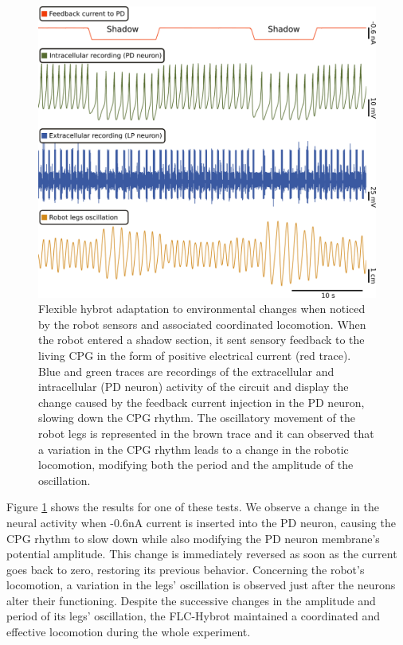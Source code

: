 \begin{figure}[hbt!]
	\begin{center}
		\includegraphics[width=0.8\linewidth]{./img/invariants/robot/robot_results_validation}
	\end{center}
	\caption{Flexible hybrot adaptation to environmental changes when noticed by the robot sensors and associated coordinated locomotion. When the robot entered a shadow section, it sent sensory feedback to the living CPG in the form of positive electrical current (red trace). Blue and green traces are recordings of the extracellular and intracellular (PD neuron) activity of the circuit and display the change caused by the feedback current injection in the PD neuron, slowing down the CPG rhythm. The oscillatory movement of the robot legs is represented in the brown trace and it can observed that a variation in the CPG rhythm leads to a change in the robotic locomotion, modifying both the period and the amplitude of the oscillation. 
	}
	\label{fig:robot_results_validation}
\end{figure}

Figure \ref{fig:robot_results_validation} shows the results for one of these tests. We observe a change in the neural activity when -0.6nA current is inserted into the PD neuron, causing the CPG rhythm to slow down while also modifying the PD neuron membrane's potential amplitude. This change is immediately reversed as soon as the current goes back to zero, restoring its previous behavior. Concerning the robot's locomotion, a variation in the legs' oscillation is observed just after the neurons alter their functioning. Despite the successive changes in the amplitude and period of its legs' oscillation, the FLC-Hybrot maintained a coordinated and effective locomotion during the whole experiment. 

